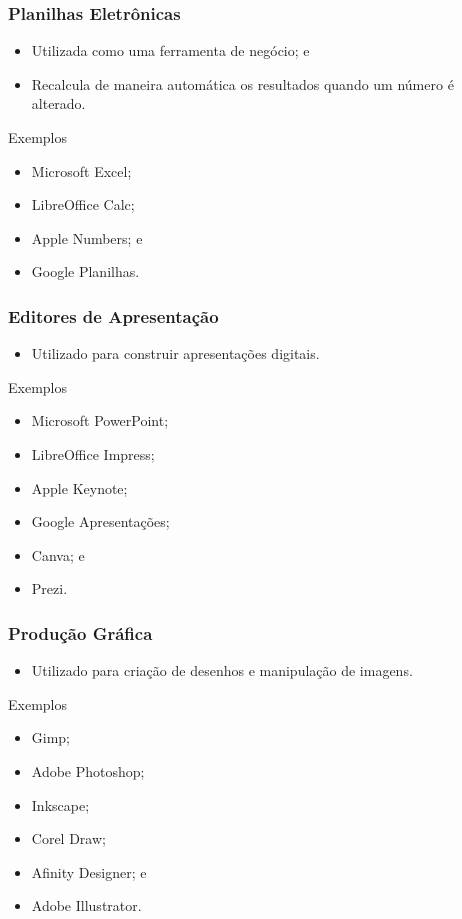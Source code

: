 \documentclass[aspectratio=169]{beamer} %
\begin{document}
\begin{frame}
	\frametitle{Planilhas Eletrônicas}
		
	\begin{itemize}
		\item Utilizada como uma ferramenta de negócio; e
		\item Recalcula de maneira automática os resultados quando um número é alterado.
	\end{itemize}\vfill
	
	\begin{exampleblock}{Exemplos}
	\begin{itemize}
		\item Microsoft Excel;
		\item LibreOffice Calc;
		\item Apple Numbers; e
		\item Google Planilhas.
	\end{itemize}
	\end{exampleblock}
\end{frame}

\begin{frame}
	\frametitle{Editores de Apresenta\c cão}
		
	\begin{itemize}
		\item Utilizado para construir apresenta\c cões digitais.
	\end{itemize}\vfill
	
	\begin{exampleblock}{Exemplos}
	\begin{itemize}
		\item  Microsoft PowerPoint;
		\item LibreOffice Impress;
		\item Apple Keynote;
		\item Google Apresenta\c cões;
		\item Canva; e 
		\item Prezi.
	\end{itemize}
	\end{exampleblock}
\end{frame}

\begin{frame}
	\frametitle{Produ\c cão Gráfica}
		
	\begin{itemize}
		\item Utilizado para cria\c cão de desenhos e manipulação de imagens.
	\end{itemize}\vfill
	
	\begin{exampleblock}{Exemplos}
	\begin{itemize}
		\item Gimp; 
		\item Adobe Photoshop;
		\item Inkscape;
		\item Corel Draw; 
		\item Afinity Designer; e 
		\item Adobe Illustrator.
	\end{itemize}
	\end{exampleblock}
\end{frame}
\end{document}
